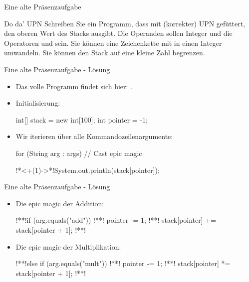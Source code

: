 \begin{frame}[c,fragile]{Eine alte Präsenzaufgabe}
    \setcounter{algocf}{0}
    \begin{aufgabe}{Do da' UPN}
        \pause{}Schreiben Sie ein Programm, dass mit (korrekter) UPN gefüttert, den oberen Wert des Stacks ausgibt.\pause{} Die Operanden sollen Integer und die Operatoren  und  sein. Sie können eine Zeichenkette mit  in einen Integer umwandeln.\pause{} Sie können den Stack auf eine kleine Zahl begrenzen.\pause\par
    \end{aufgabe}
\end{frame}

\begingroup
{}
\begin{frame}[t,fragile]{Eine alte Präsenzaufgabe - Lösung}
\begin{itemize}[<+(1)->]
    \item Das volle Programm findet sich hier: .
    \item Initialisierung:
\begin{java}
int[] stack = new int[100];
int pointer = -1;
\end{java}
    \item Wir iterieren über alle Kommandozeilenargumente:
\begin{java}[firstnumber=3]
for (String arg : args) {
    // Cast epic magic
}

!*\onslide<+(1)->*!System.out.println(stack[pointer]);
\end{java}
\end{itemize}
\end{frame}

\begin{frame}[t,fragile]{Eine alte Präsenzaufgabe - Lösung}
\begin{itemize}[<+(1)->]
    \item Die epic magic der Addition:
\begin{java}[firstnumber=4]
!**!if (arg.equals("add")) {
!**!    pointer -= 1;
!**!    stack[pointer] += stack[pointer + 1];
!**!}
\end{java}
    \item<5-> Die epic magic der Multiplikation:
\begin{java}[firstnumber=10]
!**!else if (arg.equals("mult")) {
!**!    pointer -= 1;
!**!    stack[pointer] *= stack[pointer + 1];
!**!}
\end{java}
\end{itemize}
\end{frame}

